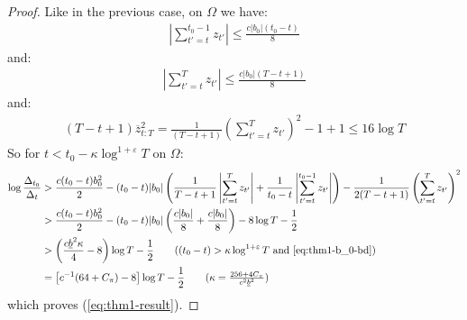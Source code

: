 \begin{proof}
\normalsize
Like in the previous case, on $\Omega$ we have:
\begin{align*}
    \left|\sum_{t'=t}^{t_0-1}z_{t'}\right| \leq \frac{c|b_0|(t_0 - t)}{8} 
\end{align*}
and:
\begin{align*}
    \left|\sum_{t'=t}^T z_{t'}\right| \leq \frac{c|b_0|(T - t + 1)}{8} 
\end{align*}
and:
\begin{align*}
    (T-t+1)\overline{z}^2_{t:T} = \frac{1}{(T-t+1)}\left(\sum_{t'=t}^T z_{t'}\right)^2 - 1 +1 \leq 16\log T
\end{align*}
So for $t < t_0 - \kappa \log^{1+\varepsilon} T$ on $\Omega$:
\begin{align*}
    \log \frac{\Delta_{t_0}}{\Delta_t} &> \frac{c (t_0-t)b_0^2 }{2} - (t_0 -t) |b_0| \left(\frac{1}{T-t+1}\left|\sum_{t'=t}^{T} z_{t'}\right| + \frac{1}{t_0-t}\left|\sum_{t'=t}^{t_0-1} z_{t'}\right|\right) -\frac{1}{2(T-t+1)}\left(\sum_{t'=t}^{T} z_{t'}\right)^2 \\
    &> \frac{c (t_0-t)b_0^2 }{2} - (t_0 -t) |b_0| \left(\frac{c|b_0|}{8} + \frac{c|b_0|}{8}\right) -8\log T - \frac{1}{2} \\
    &> \left(\frac{c\underline{b}^2\kappa}{4} - 8\right)\log T - \frac{1}{2} \tag{$(t_0-t) > \kappa\log^{1+\varepsilon} T$ and \ref{eq:thm1-b_0-bd}} \\
    &= \left[c^{-1}(64 + C_\pi) - 8\right] \log T - \frac{1}{2} \tag{$\kappa = \frac{256 + 4 C_\pi}{c^2\underline{b}^2}$}
\end{align*}
which proves (\ref{eq:thm1-result}).


\end{proof}